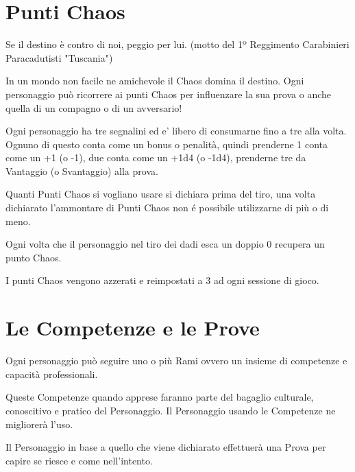 \documentclass[12pt,a4paper,twoside,openany]{book}
\begin{document}
\section{Punti Chaos}

\begin{multicols}{2}
	

\begin{changemargin}{0.3cm}{0.3cm}\begin{enfasi}{Se il destino è contro di noi, peggio per lui. (motto del 1º Reggimento Carabinieri Paracadutisti "Tuscania")}\end{enfasi}\end{changemargin}

In un mondo non facile ne amichevole il Chaos domina il destino. Ogni personaggio può ricorrere ai punti Chaos per influenzare la sua prova o anche quella di un compagno o di un avversario!

Ogni personaggio ha tre segnalini ed e' libero di consumarne fino a tre alla volta. Ognuno di questo conta come un bonus o penalità, quindi prenderne 1 conta come un +1 (o -1), due conta come un +1d4 (o -1d4), prenderne tre da Vantaggio (o Svantaggio) alla prova. 

Quanti Punti Chaos si vogliano usare si dichiara prima del tiro, una volta dichiarato l'ammontare di Punti Chaos non é possibile utilizzarne di più o di meno.

Ogni volta che il personaggio nel tiro dei dadi esca un doppio 0 recupera un punto Chaos.

I punti Chaos vengono azzerati e reimpostati a 3 ad ogni sessione di gioco.

\end{multicols}

\pagebreak

\section{Le Competenze e le Prove}

\begin{multicols}{2}

Ogni personaggio può seguire uno o più Rami ovvero un insieme di competenze e capacità professionali.

Queste Competenze quando apprese faranno parte del bagaglio culturale, conoscitivo e pratico del Personaggio. Il Personaggio usando le Competenze ne migliorerà l'uso.

Il Personaggio in base a quello che viene dichiarato effettuerà una Prova per capire se riesce e come nell'intento. 

\end{multicols}
\end{document}
